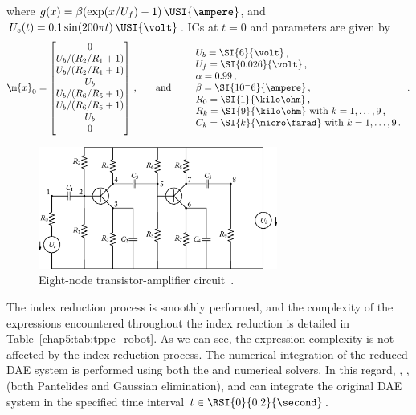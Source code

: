 %
where $g(x) = \beta(\exp(x/U_f) - 1)\,\USI{\ampere}$, and $U_e(t) = 0.1\sin(200 \pi t)\,\USI{\volt}$. \acp{IC} at $t = 0$ and parameters are given by
%
\begin{equation*}
  \m{x}_0 = \begin{bmatrix}
    0 \\
    U_b/(R_2/R_1 + 1) \\
    U_b/(R_2/R_1 + 1) \\
    U_b \\
    U_b/(R_6/R_5 + 1) \\
    U_b/(R_6/R_5 + 1) \\
    U_b \\
    0 \\
  \end{bmatrix} \, \text{,}
  \qquad \text{and} \qquad
  \begin{array}{l}
    U_b = \SI{6}{\volt} \, \text{,} \\
    U_f = \SI{0.026}{\volt} \, \text{,} \\
    \alpha = 0.99 \, \text{,} \\
    \beta = \SI{10^-6}{\ampere} \, \text{,} \\
    R_0 = \SI{1}{\kilo\ohm} \, \text{,} \\
    R_k = \SI{9}{\kilo\ohm} ~ \text{with} ~ k=1, \dots, 9 \, \text{,} \\
    C_k = \SI{k}{\micro\farad} ~ \text{with} ~ k=1, \dots, 9 \, \text{.} \\
  \end{array} \, \text{.}
\end{equation*}

\begin{figure}
  \centering
  \includegraphics[width=0.7\textwidth]{figures/chapter_5/transistor_amplifier.eps}
  \caption{Eight-node transistor-amplifier circuit~\cite{lioen1998test, mazzia2008test}.}
  \label{chap5:fig:transistor_amplifier}
\end{figure}

The index reduction process is smoothly performed, and the complexity of the expressions encountered throughout the index reduction is detailed in Table~\ref{chap5:tab:tppc_robot}. As we can see, the expression complexity is not affected by the index reduction process. The numerical integration of the reduced \ac{DAE} system is performed using both the \Maple{} and \Indigo{} numerical solvers. In this regard, \Maple{}, \Mathematica{}, \Matlab{} (both Pantelides and Gaussian elimination), and \Indigo{} can integrate the original \ac{DAE} system in the specified time interval $t \in \RSI{0}{0.2}{\second}$.

